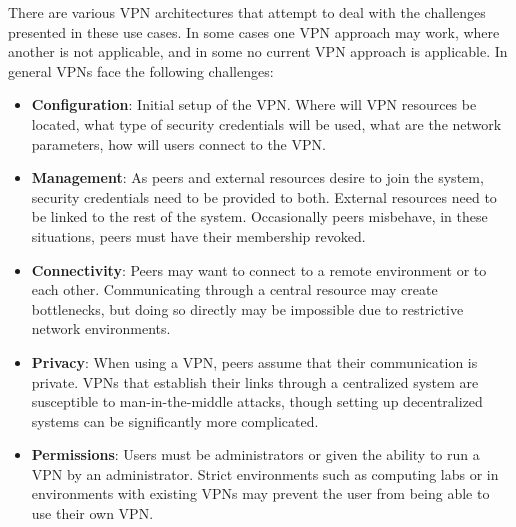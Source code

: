 There are various VPN architectures that attempt to deal with the challenges
presented in these use cases.  In some cases one VPN approach may work,
where another is not applicable, and in some no current VPN approach is
applicable.  In general VPNs face the following challenges:  
\begin{itemize}
\item \textbf{Configuration}:  Initial setup of the VPN.  Where will VPN
resources be located, what type of security credentials will be used, what are
the network parameters, how will users connect to the VPN.
\item \textbf{Management}:  As peers and external resources desire to join the
system, security credentials need to be provided to both.  External resources
need to be linked to the rest of the system.  Occasionally peers misbehave, in
these situations, peers must have their membership revoked.
\item \textbf{Connectivity}:  Peers may want to connect to a remote environment
or to each other.  Communicating through a central resource may create
bottlenecks, but doing so directly may be impossible due to restrictive network
environments.
\item \textbf{Privacy}:  When using a VPN, peers assume that their communication
is private.  VPNs that establish their links through a centralized system are
susceptible to man-in-the-middle attacks, though setting up decentralized
systems can be significantly more complicated.
\item \textbf{Permissions}:  Users must be administrators or given the ability
to run a VPN by an administrator.  Strict environments such as computing labs
or in environments with existing VPNs may prevent the user from being able
to use their own VPN.
\end{itemize}

